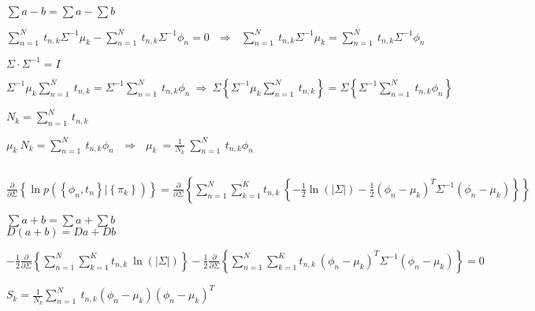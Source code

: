 \documentclass{article}
\begin{document}
\begin{center}
    $\displaystyle  \sum{a-b}=\sum a-\sum b $
\end{center}

$ \displaystyle
    \sum_{n=1}^{N}{\ t_{n,k}\Sigma^{-1}\mu_k}-\sum_{n=1}^{N}{\ t_{n,k}\Sigma^{-1}\phi_n}=0\ \ \ \Longrightarrow\ \ \ \sum_{n=1}^{N}{\ t_{n,k}\Sigma^{-1}\mu_k}=\sum_{n=1}^{N}{\ t_{n,k}\Sigma^{-1}\phi_n}
$

\begin{center}
    $ \displaystyle \Sigma \cdot \Sigma^{-1}=I $
\end{center}

$ \displaystyle
    \Sigma^{-1}\mu_k\sum_{n=1}^{N}{\ t_{n,k}}=\Sigma^{-1}\sum_{n=1}^{N}{\ t_{n,k}\phi_n}\ \Longrightarrow\ \Sigma\left\{\Sigma^{-1}\mu_k\sum_{n=1}^{N}{\ t_{n,k}}\right\}=\Sigma\left\{\Sigma^{-1}\sum_{n=1}^{N}{\ t_{n,k}\phi_n}\right\}\ \ 
$

\begin{center}
    $ \displaystyle N_k=\sum_{n=1}^{N}{\ t_{n,k}} $
\end{center}

$ \displaystyle
    \mu_k\ N_k=\sum_{n=1}^{N}{\ t_{n,k}\phi_n}\ \ \ \Longrightarrow\ \ \ \mu_k\ =\frac{1}{N_k}\ \sum_{n=1}^{N}{\ t_{n,k}\phi_n}\ 
$

\begin{center}
    $  $
\end{center}

$ \displaystyle
    \frac{\partial}{\partial\Sigma}\left\{\ln{p\left(\left\{\phi_n,t_n\right\}|\left\{\pi_k\right\}\right)}\right\}=\frac{\partial}{\partial\Sigma}\left\{\sum_{n=1}^{N}\sum_{k=1}^{K}{t_{n,k}\ \left\{-\frac{1}{2}\ln{\left(\left|\Sigma\right|\right)}-\frac{1}{2}\left(\phi_n-\mu_k\right)^T\Sigma^{-1}\left(\phi_n-\mu_k\right)\right\}}\right\}
$

\begin{center}
    $\displaystyle \sum{a+b}=\sum a+\sum b $ \\
    $\displaystyle D\left(a+b\right)=Da+Db $
\end{center}

$ \displaystyle
    -\frac{1}{2}\frac{\partial}{\partial\Sigma}\left\{\sum_{n=1}^{N}\sum_{k=1}^{K}{t_{n,k}\ \ln{\left(\left|\Sigma\right|\right)}}\right\}-\frac{1}{2}\frac{\partial}{\partial\Sigma}\left\{\sum_{n=1}^{N}\sum_{k=1}^{K}{t_{n,k}\ \left(\phi_n-\mu_k\right)^T\Sigma^{-1}\left(\phi_n-\mu_k\right)}\right\}=0
$

\begin{center}
    $ \displaystyle S_k=\frac{1}{N_k}\sum_{n=1}^{N}{\ t_{n,k}\left(\phi_n-\mu_k\right)\left(\phi_n-\mu_k\right)^T} $
\end{center}
\end{document}
